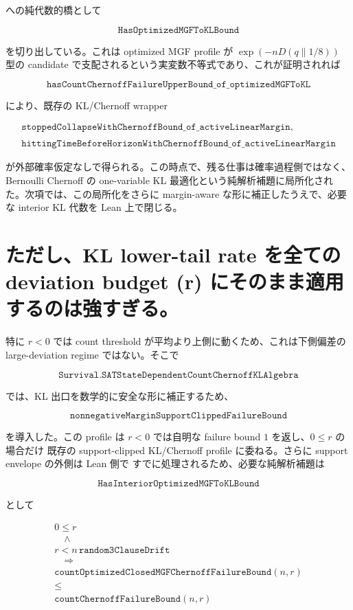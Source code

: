 \documentclass[12pt,a4paper]{article}
\begin{document}
への純代数的橋として

\[
\texttt{HasOptimizedMGFToKLBound}
\]

を切り出している。これは optimized MGF profile が \(\exp(-nD(q\|1/8))\) 型の candidate で支配されるという実変数不等式であり、これが証明されれば

\[
\texttt{hasCountChernoffFailureUpperBound\_of\_optimizedMGFToKL}
\]

により、既存の KL/Chernoff wrapper

\[
\begin{aligned}
\texttt{stoppedCollapseWithChernoffBound\_of\_activeLinearMargin}, \\
\qquad \\
\texttt{hittingTimeBeforeHorizonWithChernoffBound\_of\_activeLinearMargin}
\end{aligned}
\]

が外部確率仮定なしで得られる。この時点で、残る仕事は確率過程側ではなく、Bernoulli Chernoff の one-variable KL 最適化という純解析補題に局所化された。次項では、この局所化をさらに margin-aware な形に補正したうえで、必要な interior KL 代数を Lean 上で閉じる。

\section{ただし、KL lower-tail rate を全ての deviation budget (r) にそのまま適用するのは強すぎる。}\label{ux305fux3060ux3057kl-lower-tail-rate-ux3092ux5168ux3066ux306e-deviation-budget-r-ux306bux305dux306eux307eux307eux9069ux7528ux3059ux308bux306eux306fux5f37ux3059ux304eux308b}

特に \(r<0\) では count threshold が平均より上側に動くため、これは下側偏差の large-deviation regime ではない。そこで

\[
\texttt{Survival.SATStateDependentCountChernoffKLAlgebra}
\]

では、KL 出口を数学的に安全な形に補正するため、

\[
\texttt{nonnegativeMarginSupportClippedFailureBound}
\]

を導入した。この profile は \(r<0\) では自明な failure bound \(1\) を返し、\(0\le r\) の場合だけ 既存の support-clipped KL/Chernoff profile に委ねる。さらに support envelope の外側は Lean 側で すでに処理されるため、必要な純解析補題は

\[
\texttt{HasInteriorOptimizedMGFToKLBound}
\]

として

\[
\begin{aligned}
0\le r \\
\quad\wedge\quad \\
r < n\,\texttt{random3ClauseDrift} \\
\quad\Longrightarrow\quad \\
\texttt{countOptimizedClosedMGFChernoffFailureBound}(n,r) \\
\le \\
\texttt{countChernoffFailureBound}(n,r)
\end{aligned}
\]
\end{document}

